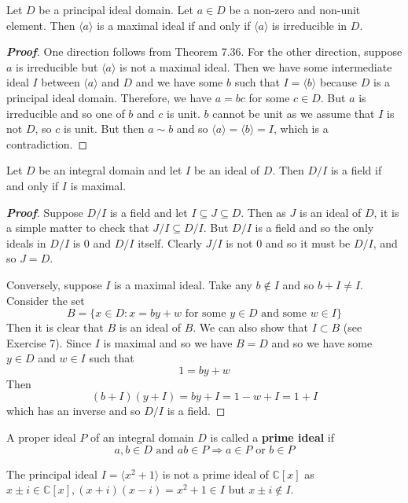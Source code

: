 \begin{theorem} Let $D$ be a principal ideal domain. Let $a \in D$ be a non-zero and non-unit element.
Then $\langle a \rangle$ is a maximal ideal if and only if $\langle a \rangle$ is irreducible in $D$.
\end{theorem}
\begin{proof}[\bf Proof] One direction follows from Theorem 7.36. For the other direction, suppose $a$ is irreducible but $\langle a \rangle$ is not a maximal ideal. Then we have some intermediate ideal $I$ between $\langle a \rangle$ and $D$ and we have some $b$ such that $I=\langle b \rangle$ because $D$ is a principal ideal domain. Therefore, we have $a=bc$ for some $c \in D$. But $a$ is irreducible and so one of $b$ and $c$ is unit. $b$ cannot be unit as we assume that $I$ is not $D$, so $c$ is unit. But then
$a \sim b$ and so $\langle a \rangle=\langle b \rangle=I$, which is a contradiction.
\end{proof}
\begin{theorem} Let $D$ be an integral domain and let $I$ be an ideal of $D$. Then $D/I$ is a field if and only if $I$ is maximal.
\end{theorem}
\begin{proof}[\bf Proof] Suppose $D/I$ is a field and let $I \subseteq J \subseteq D$. Then as $J$ is an ideal of $D$, it is a simple matter to check that $J/I \subseteq D/I$. But $D/I$ is a field and so the only ideals in $D/I$ is $0$ and $D/I$ itself. Clearly $J/I$ is not $0$ and so it must be $D/I$, and so $J=D$.

Conversely, suppose $I$ is a maximal ideal. Take any $b \not \in I$ and so $b+I \neq I$. Consider the set $$B=\{x \in D: x=by+w \text{ for some } y \in D \text{ and some } w \in I\}$$
Then it is clear that $B$ is an ideal of $B$. We can also show that $I \subset B$ (see Exercise 7). Since $I$ is maximal and so we have $B=D$ and so we have some $y \in D$ and $w \in I$ such that
$$1=by+w$$
Then $$(b+I)(y+I)=by+I=1-w+I=1+I$$ which has an inverse and so $D/I$ is a field.
\end{proof}
\begin{definition} A proper ideal $P$ of an integral domain $D$ is called a {\bf prime ideal} if
$$a,b \in D \text{ and } ab \in P \Rightarrow a \in P \text{ or } b \in P$$
\end{definition}
\begin{example} The principal ideal $I=\langle x^2+1 \rangle$ is not a prime ideal of $\mathbb{C}[x]$ as
$x \pm i \in \mathbb{C}[x],(x+i)(x-i)=x^2+1 \in I$ but $x \pm i \not \in I$.
\end{example}
